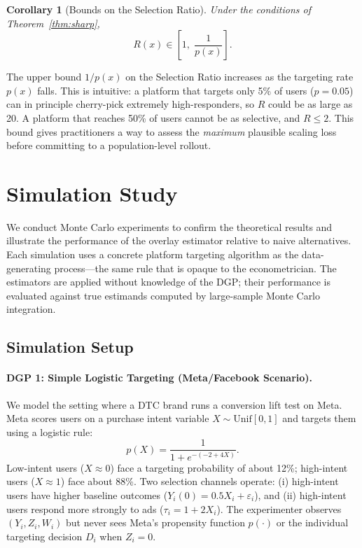 \documentclass[12pt]{article}
\newtheorem{corollary}{Corollary}
\begin{document}
\begin{corollary}[Bounds on the Selection Ratio]
\label{cor:ratio}
Under the conditions of Theorem~\ref{thm:sharp},
\begin{equation}
  R(x) \in \left[1,\; \frac{1}{p(x)}\right].
  \label{eq:ratio_bounds}
\end{equation}
\end{corollary}

The upper bound $1/p(x)$ on the Selection Ratio increases as the targeting
rate $p(x)$ falls. This is intuitive: a platform that targets only 5\% of
users ($p = 0.05$) can in principle cherry-pick extremely high-responders,
so $R$ could be as large as 20. A platform that reaches 50\% of users
cannot be as selective, and $R \leq 2$. This bound gives practitioners a
way to assess the \emph{maximum} plausible scaling loss before committing
to a population-level rollout.

\section{Simulation Study}
\label{sec:simulation}

We conduct Monte Carlo experiments to confirm the theoretical results and
illustrate the performance of the overlay estimator relative to naive
alternatives. Each simulation uses a concrete platform targeting algorithm
as the data-generating process---the same rule that is opaque to the
econometrician. The estimators are applied without knowledge of the DGP;
their performance is evaluated against true estimands computed by
large-sample Monte Carlo integration.

\subsection{Simulation Setup}

\paragraph{DGP 1: Simple Logistic Targeting (Meta/Facebook Scenario).}

We model the setting where a DTC brand runs a conversion lift test on Meta.
Meta scores users on a purchase intent variable $X \sim \mathrm{Unif}[0,1]$
and targets them using a logistic rule:
\[
  p(X) = \frac{1}{1 + e^{-(-2 + 4X)}}.
\]
Low-intent users ($X \approx 0$) face a targeting probability of about 12\%;
high-intent users ($X \approx 1$) face about 88\%. Two selection channels
operate: (i) high-intent users have higher baseline outcomes
($Y_i(0) = 0.5X_i + \varepsilon_i$), and (ii) high-intent users respond
more strongly to ads ($\tau_i = 1 + 2X_i$). The experimenter observes
$(Y_i, Z_i, W_i)$ but never sees Meta's propensity function $p(\cdot)$ or
the individual targeting decision $D_i$ when $Z_i = 0$.
\end{document}

